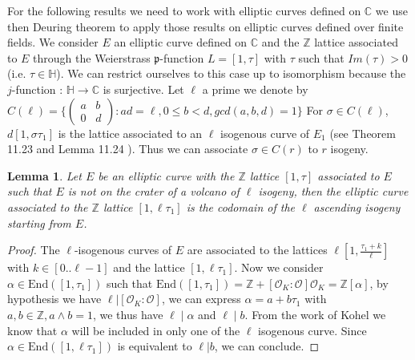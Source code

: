 \documentclass{lms}
\newtheorem{lem}[thm]{Lemma}
\begin{document}
For the following results we need to work with elliptic curves defined on $\mathbb{C}$ we use then Deuring theorem to apply those results on elliptic curves defined over finite fields.
We consider $E$ an elliptic curve defined on $\mathbb{C}$ and the $\mathbb{Z}$ lattice associated to $E$ through the Weierstrass $\mathfrak{p}$-function $L=[1,\tau]$ with $\tau$ such that $Im(\tau)>0$(i.e. $\tau \in \mathbb{H}$). We can restrict ourselves to this case up to isomorphism because the $j$-function : $\mathbb{H} \rightarrow \mathbb{C}$ is surjective. Let $\ell$ a prime we denote by
$C(\ell)=\{\left(\begin{array}{cc}
a & b\\
0 & d
\end{array}\right): ad= \ell,0\leqslant b <d, gcd(a,b,d)=1\}$
 For $\sigma \in C(\ell)$, $d[1,\sigma \tau_1]$ is the lattice associated to an $\ell$ isogenous curve of $E_1$ (see Theorem 11.23 and Lemma 11.24 \cite{Cox89}). Thus we can associate $\sigma \in C(r)$ to $r$ isogeny.



\begin{lem} 
Let $E$ be an elliptic curve with the $\mathbb{Z} $ lattice $[1,\tau ]$ associated to $E$ such that $E$ is not on the crater of a volcano of $\ell$ isogeny, then the elliptic curve associated to the $\mathbb{Z}$ lattice $ [ 1, \ell \tau_1 ] $ is the codomain of the $\ell$ ascending isogeny starting from $E$. 
\end{lem}

\begin{proof}
The $\ell$-isogenous curves of $E$ are associated to the lattices $\ell[1,\frac{\tau_1+k}{\ell}]$ with $k \in [0..\ell-1]$ and the lattice $[1,\ell \tau_1]$. Now we consider $\alpha \in \mathrm{End}([1,\tau_1])$ such that $\mathrm{End}([1,\tau_1])= \mathbb{Z} + [\mathcal{O}_K:\mathcal{O}]\mathcal{O}_K=\mathbb{Z}[\alpha]$, by hypothesis we have $\ell | [\mathcal{O}_K:\mathcal{O}]$, we can express $\alpha = a + b \tau_1$ with $a,b \in \mathbb{Z}, a \wedge b =1$, we thus have $\ell \mid \alpha$ and $\ell \mid b$. From the work of Kohel \cite{Kohel} we know that $\alpha$ will be included in only one of the $\ell$ isogenous curve. Since $\alpha \in \mathrm{End}([1,\ell\tau_1]) $ is equivalent to $\ell | b$, we can conclude.
\end{proof}
\end{document}
